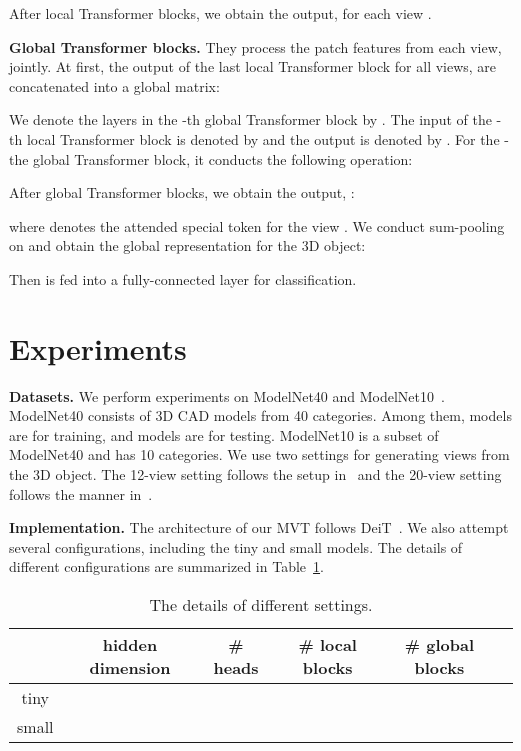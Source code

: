 \documentclass{bmvc2k}
\begin{document}
After  local Transformer blocks, we obtain the output,  for each view . 

\vspace{0.1in}

\noindent \textbf{Global Transformer blocks.} They process the patch features from each view, jointly. At first, the output of the last local Transformer block for all views,   are concatenated into a global matrix:

We denote the layers in the -th global Transformer block by .  The input of the -th local Transformer block  is denoted by   and the output is denoted  by .  For the -the global Transformer block, it conducts the following operation:

After  global Transformer blocks, we obtain the output, :

where  denotes the attended  special token for the view . We conduct sum-pooling on  and obtain the global representation for the 3D object:

Then  is fed into a fully-connected layer for classification.


\vspace{-0.1in}
\section{Experiments}

\vspace{-0.1in}


\textbf{Datasets.}
We perform experiments on ModelNet40 and ModelNet10~\cite{wu20153d}. ModelNet40 consists of  3D CAD models from 40 categories. 
Among them,  models are for training, and  models are for testing. ModelNet10 is a subset of ModelNet40 and has 10 categories.
We use two settings for generating views from the 3D object.
The 12-view setting follows the setup in~\cite{wang2017dominant} and the 20-view setting follows the manner in~\cite{kanezaki2018rotationnet}.

\vspace{0.1in}
\noindent \textbf{Implementation.}
The architecture of our MVT follows  DeiT~\cite{touvron2020training}. We also attempt several configurations, including the tiny and small models. The details of different configurations are summarized in Table~\ref{tab:details}.

\begin{table}[h!]
\centering
\begin{tabular}{cccccc}
\toprule
      & hidden dimension & \# heads & \# local blocks & \# global blocks &  \\ \hline
tiny  &                  &          &                 &                  &  \\ 
small &                  &          &                 &                  &  \\  \toprule
\end{tabular}
\caption{The details of different settings.}
\label{tab:details}\vspace{-0.1in}
\end{table}
\end{document}
